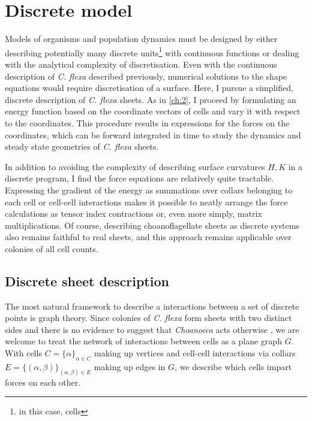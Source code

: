 \chapter{Discrete model} \label{ch:3}

\ifpdf
    \graphicspath{{Chapter3/Figs/Raster/}{Chapter3/Figs/PDF/}{Chapter3/Figs/}}
\else
    \graphicspath{{Chapter3/Figs/Vector/}{Chapter3/Figs/}}
\fi

Models of organisms and population dynamics must be designed by either describing potentially many discrete units\footnote{in this case, cells} with continuous functions or dealing with the analytical complexity of discretisation. Even with the continuous description of \textit{C. flexa} described previously, numerical solutions to the shape equations would require discretisation of a surface. Here, I pursue a simplified, discrete description of \textit{C. flexa} sheets. As in \cref{ch:2}, I proceed by formulating an energy function based on the coordinate vectors of cells and vary it with respect to the coordinates. This procedure results in expressions for the forces on the coordinates, which can be forward integrated in time to study the dynamics and steady state geometries of \textit{C. flexa} sheets.

In addition to avoiding the complexity of describing surface curvatures $H, K$ in a discrete program, I find the force equations are relatively quite tractable. Expressing the gradient of the energy as summations over collars belonging to each cell or cell-cell interactions makes it possible to neatly arrange the force calculations as tensor index contractions or, even more simply, matrix multiplications. Of course, describing choanoflagellate sheets as discrete systems also remains faithful to real sheets, and this approach remains applicable over colonies of all cell counts. 

\section{Discrete sheet description}

The most natural framework to describe a interactions between a set of discrete points is graph theory. Since colonies of \textit{C. flexa} form sheets with two distinct sides and there is no evidence to suggest that \textit{Choanoeca} acts otherwise \citep{brunet2019,leadbeater1983}, we are welcome to treat the network of interactions between cells as a plane graph $G$. With cells $C = \{\alpha\}_{\alpha\in C}$ making up vertices and cell-cell interactions via collars $E = \{(\alpha, \beta)\}_{(\alpha,\beta)\in E}$ making up edges in $G$, we describe which cells impart forces on each other.

